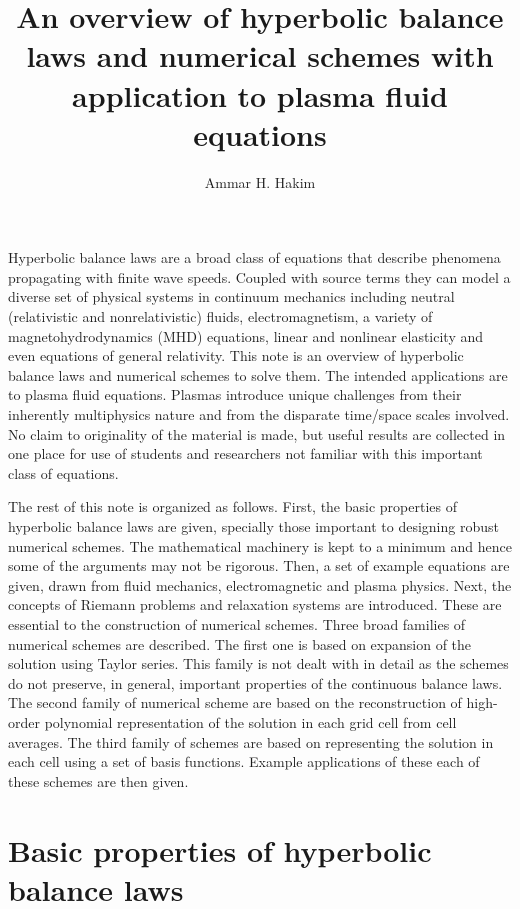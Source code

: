 \documentclass[11pt, reqno]{amsart}
\title[Hyperbolic balance laws]{An overview of hyperbolic balance laws
  and numerical schemes with application to plasma fluid equations}%
\author{Ammar H. Hakim}%
\date{}
\theoremstyle{definition}
\begin{document}
\maketitle

Hyperbolic balance laws are a broad class of equations that describe
phenomena propagating with finite wave speeds. Coupled with source
terms they can model a diverse set of physical systems in continuum
mechanics including neutral (relativistic and nonrelativistic) fluids,
electromagnetism, a variety of magnetohydrodynamics (MHD) equations,
linear and nonlinear elasticity and even equations of general
relativity. This note is an overview of hyperbolic balance laws and
numerical schemes to solve them. The intended applications are to
plasma fluid equations. Plasmas introduce unique challenges from their
inherently multiphysics nature and from the disparate time/space
scales involved. No claim to originality of the material is made, but
useful results are collected in one place for use of students and
researchers not familiar with this important class of equations.

The rest of this note is organized as follows. First, the basic
properties of hyperbolic balance laws are given, specially those
important to designing robust numerical schemes. The mathematical
machinery is kept to a minimum and hence some of the arguments may not
be rigorous. Then, a set of example equations are given, drawn from
fluid mechanics, electromagnetic and plasma physics. Next, the
concepts of Riemann problems and relaxation systems are
introduced. These are essential to the construction of numerical
schemes. Three broad families of numerical schemes are described. The
first one is based on expansion of the solution using Taylor
series. This family is not dealt with in detail as the schemes do not
preserve, in general, important properties of the continuous balance
laws. The second family of numerical scheme are based on the
reconstruction of high-order polynomial representation of the solution
in each grid cell from cell averages. The third family of schemes are
based on representing the solution in each cell using a set of basis
functions. Example applications of these each of these schemes are
then given.

\section{Basic properties of hyperbolic balance laws}
\end{document}
